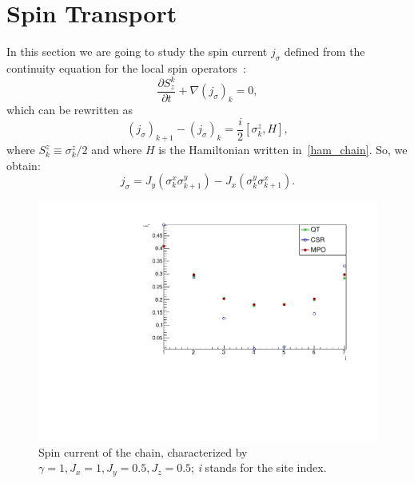 \section{Spin Transport}
In this section we are going to study the spin current $j_\sigma$ defined from the continuity equation for the local spin operators~\cite{BenentiCasatiProsenRossini}:
\begin{equation}
    \frac{\partial S^k_z}{\partial t} + \nabla (j_\sigma)_k = 0,
\end{equation}
which can be rewritten as
\begin{equation}
    (j_\sigma)_{k+1}-(j_\sigma)_k = \frac{i}{2}[\sigma_k^z , H],
\end{equation}
where $S_k^z \equiv \sigma_k^z/2$ and where $H$ is the Hamiltonian written in~\ref{ham_chain}. So, we obtain:
\begin{equation}
    j_\sigma = J_y (\sigma_k^x \sigma_{k+1}^y) - J_x (\sigma_k^y \sigma_{k+1}^x).
\end{equation}

\begin{figure}[H]
    \centering
    \includegraphics[scale=0.7]{Figures/8sites_comparison/SpinCurr_8s_J10505.pdf}
    \caption{Spin current of the chain, characterized by $\gamma=1, J_x=1, J_y=0.5, J_z=0.5$; \emph{i} stands for the site index.}
    \label{fig:my_label}
\end{figure}

